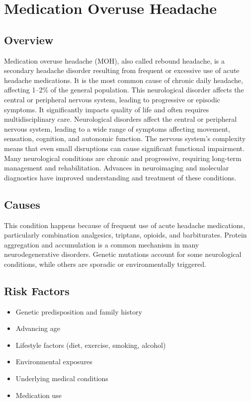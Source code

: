 \chapter{Medication Overuse Headache}
\label{sec:Medication Overuse Headache}

\section{Overview}
Medication overuse headache (MOH), also called rebound headache, is a secondary headache disorder resulting from frequent or excessive use of acute headache medications. It is the most common cause of chronic daily headache, affecting 1--2\% of the general population. This neurological disorder affects the central or peripheral nervous system, leading to progressive or episodic symptoms. It significantly impacts quality of life and often requires multidisciplinary care. Neurological disorders affect the central or peripheral nervous system, leading to a wide range of symptoms affecting movement, sensation, cognition, and autonomic function. The nervous system's complexity means that even small disruptions can cause significant functional impairment. Many neurological conditions are chronic and progressive, requiring long-term management and rehabilitation. Advances in neuroimaging and molecular diagnostics have improved understanding and treatment of these conditions.
\section{Causes}
This condition happens because of frequent use of acute headache medications, particularly combination analgesics, triptans, opioids, and barbiturates.    Protein aggregation and accumulation is a common mechanism in many neurodegenerative disorders.  Genetic mutations account for some neurological conditions, while others are sporadic or environmentally triggered.   
\section{Risk Factors}
\begin{itemize}[noitemsep]
  \item Genetic predisposition and family history
  \item Advancing age
  \item Lifestyle factors (diet, exercise, smoking, alcohol)
  \item Environmental exposures
  \item Underlying medical conditions
  \item Medication use
\end{itemize}
